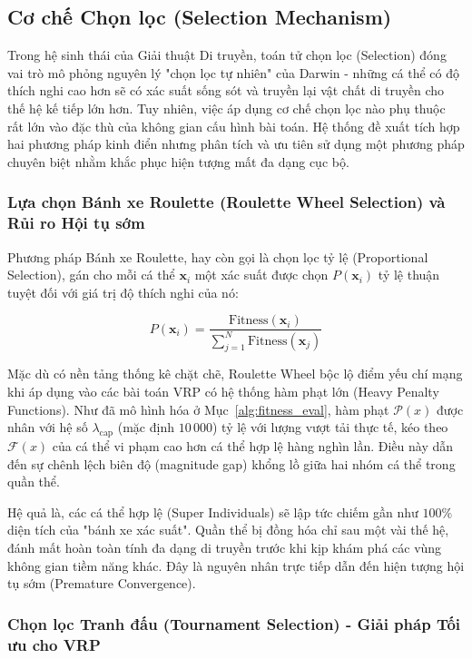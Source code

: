 \documentclass[12pt,a4paper]{article}
\numberwithin{figure}{subsection}
\numberwithin{table}{subsection}
\begin{document}
\subsection{Cơ chế Chọn lọc (Selection Mechanism)}

Trong hệ sinh thái của Giải thuật Di truyền, toán tử chọn lọc (Selection) đóng vai trò mô phỏng nguyên lý "chọn lọc tự nhiên" của Darwin - những cá thể có độ thích nghi cao hơn sẽ có xác suất sống sót và truyền lại vật chất di truyền cho thế hệ kế tiếp lớn hơn. Tuy nhiên, việc áp dụng cơ chế chọn lọc nào phụ thuộc rất lớn vào đặc thù của không gian cấu hình bài toán. Hệ thống đề xuất tích hợp hai phương pháp kinh điển nhưng phân tích và ưu tiên sử dụng một phương pháp chuyên biệt nhằm khắc phục hiện tượng mất đa dạng cục bộ.

\subsubsection{Lựa chọn Bánh xe Roulette (Roulette Wheel Selection) và Rủi ro Hội tụ sớm}

Phương pháp Bánh xe Roulette, hay còn gọi là chọn lọc tỷ lệ (Proportional Selection), gán cho mỗi cá thể $\textbf{x}_i$ một xác suất được chọn $P(\textbf{x}_i)$ tỷ lệ thuận tuyệt đối với giá trị độ thích nghi của nó:

\[ P(\textbf{x}_i) = \frac{\text{Fitness}(\textbf{x}_i)}{\sum_{j=1}^{N} \text{Fitness}(\textbf{x}_j)} \]

Mặc dù có nền tảng thống kê chặt chẽ, Roulette Wheel bộc lộ điểm yếu chí mạng khi áp dụng vào các bài toán VRP có hệ thống hàm phạt lớn (Heavy Penalty Functions). Như đã mô hình hóa ở Mục~\ref{alg:fitness_eval}, hàm phạt $\mathcal{P}(x)$ được nhân với hệ số $\lambda_{\text{cap}}$ (mặc định $10\,000$) tỷ lệ với lượng vượt tải thực tế, kéo theo $\mathcal{F}(x)$ của cá thể vi phạm cao hơn cá thể hợp lệ hàng nghìn lần. Điều này dẫn đến sự chênh lệch biên độ (magnitude gap) khổng lồ giữa hai nhóm cá thể trong quần thể. 

Hệ quả là, các cá thể hợp lệ (Super Individuals) sẽ lập tức chiếm gần như $100\%$ diện tích của "bánh xe xác suất". Quần thể bị đồng hóa chỉ sau một vài thế hệ, đánh mất hoàn toàn tính đa dạng di truyền trước khi kịp khám phá các vùng không gian tiềm năng khác. Đây là nguyên nhân trực tiếp dẫn đến hiện tượng hội tụ sớm (Premature Convergence).

\subsubsection{Chọn lọc Tranh đấu (Tournament Selection) - Giải pháp Tối ưu cho VRP}
\end{document}
